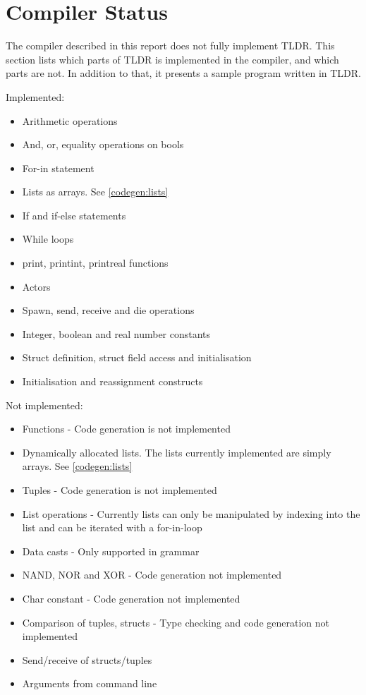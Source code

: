 \section{Compiler Status}\label{sec:compilerStatus}

The compiler described in this report does not fully implement TLDR. This section lists which parts of TLDR is implemented in the compiler, and which parts are not. In addition to that, it presents a sample program written in TLDR.


Implemented:

\begin{itemize}
\item Arithmetic operations
\item And, or, equality operations on bools
\item For-in statement
\item Lists as arrays. See \cref{codegen:lists}
\item If and if-else statements
\item While loops
\item print, printint, printreal functions
\item Actors
\item Spawn, send, receive and die operations
\item Integer, boolean and real number constants
\item Struct definition, struct field access and initialisation
\item Initialisation and reassignment constructs
\end{itemize}

Not implemented:

\begin{itemize}
\item Functions - Code generation is not implemented
\item Dynamically allocated lists. The lists currently implemented are simply arrays. See \cref{codegen:lists}
\item Tuples - Code generation is not implemented
\item List operations - Currently lists can only be manipulated by indexing into the list and can be iterated with a for-in-loop
\item Data casts - Only supported in grammar
\item NAND, NOR and XOR - Code generation not implemented
\item Char constant - Code generation not implemented
\item Comparison of tuples, structs - Type checking and code generation not implemented
\item Send/receive of structs/tuples
\item Arguments from command line
\end{itemize}

